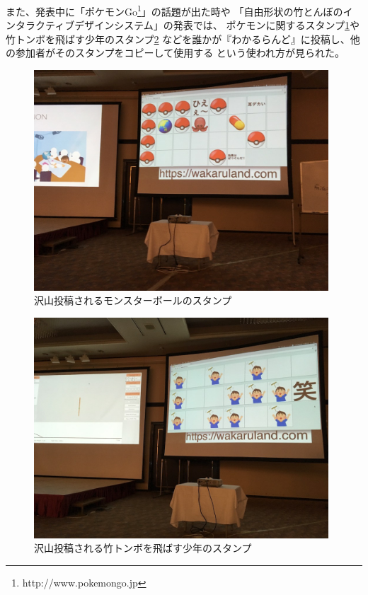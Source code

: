 また、発表中に「ポケモンGo\footnote{http://www.pokemongo.jp}」の話題が出た時や
「自由形状の竹とんぼのインタラクティブデザインシステム」の発表では、
ポケモンに関するスタンプ\ref{pokemon}や竹トンボを飛ばす少年のスタンプ\ref{taketombo}
などを誰かが『わかるらんど』に投稿し、他の参加者がそのスタンプをコピーして使用する
という使われ方が見られた。

\begin{figure}[h]
\centering
\includegraphics[width=11cm]{images/pokemon.png}
\caption{沢山投稿されるモンスターボールのスタンプ}
\label{pokemon}
\end{figure}

\begin{figure}[h]
\centering
\includegraphics[width=11cm]{images/taketombo.png}
\caption{沢山投稿される竹トンボを飛ばす少年のスタンプ}
\label{taketombo}
\end{figure}


